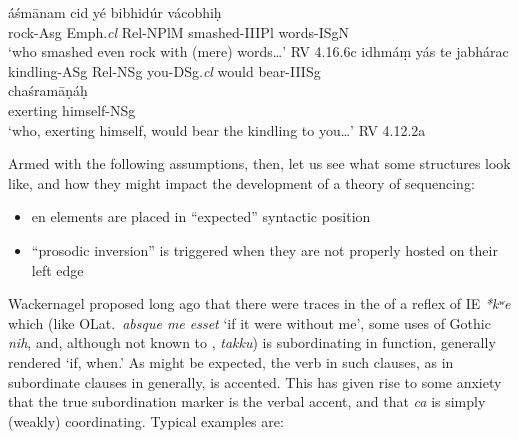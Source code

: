 \documentclass[output=paper,
modfonts
]{LSP/langsci}
\begin{document}
\begin{exe}
\ex\label{Top}
	\begin{xlist}
	\ex
		\gll {\ob}áśmānam cid{\cb} yé bibhidúr vácobhiḥ \\
			{\db}rock-Asg Emph.\textit{cl} Rel-NPlM smashed-IIIPl words-ISgN \\
		\glt `who smashed even rock with (mere) words\ldots{}' \hfill {RV 4.16.6c}
	\ex
		\gll {\ob}idhmáṃ{\cb} yás te jabhárac \\
			{\db}kindling-ASg Rel-NSg you-DSg.\textit{cl} {would bear-IIISg} \\
		
		\gll \hspace*{1em} chaśramāṇáḥ \\
			{} {exerting himself-NSg} \\
		\glt `who, exerting himself, would bear the kindling to you\ldots{}' \hfill {RV 4.12.2a}
	\end{xlist}
\end{exe}

\noindent Armed with the following assumptions, then, let us see what some structures look like, and how they might impact the development of a theory of  sequencing:

\begin{itemize}
\item en elements are placed in ``expected'' syntactic position
\item ``prosodic inversion'' is triggered when they are not properly hosted on their left edge
\end{itemize}

Wackernagel proposed long ago that there were traces in the  of a reflex
of IE \textit{*kʷe} which (like OLat.\ \textit{absque me esset} `if it were
without me', some uses of Gothic \textit{nih}, and, although not known to ,
 \textit{takku}) is subordinating in function, generally rendered `if, when.'
As might be expected, the verb in such clauses, as in subordinate clauses in
 generally, is accented. This has given rise to some anxiety that the true
subordination marker is the verbal accent, and that \textit{ca} is simply (weakly)
coordinating. Typical examples are:

\end{document}
